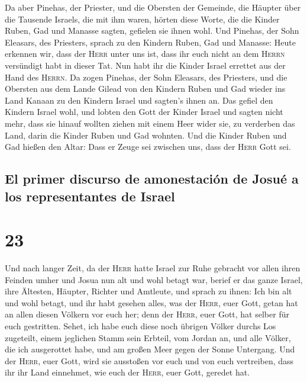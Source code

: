  Da aber Pinehas, der Priester, und die Obersten der
Gemeinde, die Häupter über die Tausende Israels, die mit ihm waren,
hörten diese Worte, die die Kinder Ruben, Gad und Manasse sagten,
gefielen sie ihnen wohl.  Und Pinehas, der Sohn Eleasars,
des Priesters, sprach zu den Kindern Ruben, Gad und Manasse: Heute
erkennen wir, dass der \textsc{Herr} unter uns ist, dass ihr euch nicht
an dem \textsc{Herrn} versündigt habt in dieser Tat. Nun habt ihr die
Kinder Israel errettet aus der Hand des \textsc{Herrn}. 
Da zogen Pinehas, der Sohn Eleasars, des Priesters, und die Obersten aus
dem Lande Gilead von den Kindern Ruben und Gad wieder ins Land Kanaan zu
den Kindern Israel und sagten's ihnen an.  Das gefiel den
Kindern Israel wohl, und lobten den Gott der Kinder Israel und sagten
nicht mehr, dass sie hinauf wollten ziehen mit einem Heer wider sie, zu
verderben das Land, darin die Kinder Ruben und Gad wohnten.
 Und die Kinder Ruben und Gad hießen den Altar: Dass er
Zeuge sei zwischen uns, dass der \textsc{Herr} Gott sei.

\hypertarget{el-primer-discurso-de-amonestaciuxf3n-de-josuuxe9-a-los-representantes-de-israel}{%
\subsection{El primer discurso de amonestación de Josué a los
representantes de
Israel}\label{el-primer-discurso-de-amonestaciuxf3n-de-josuuxe9-a-los-representantes-de-israel}}

\hypertarget{section-22}{%
\section{23}\label{section-22}}

 Und nach langer Zeit, da der \textsc{Herr} hatte Israel
zur Ruhe gebracht vor allen ihren Feinden umher und Josua nun alt und
wohl betagt war,  berief er das ganze Israel, ihre
Ältesten, Häupter, Richter und Amtleute, und sprach zu ihnen: Ich bin
alt und wohl betagt,  und ihr habt gesehen alles, was der
\textsc{Herr}, euer Gott, getan hat an allen diesen Völkern vor euch
her; denn der \textsc{Herr}, euer Gott, hat selber für euch gestritten.
 Sehet, ich habe euch diese noch übrigen Völker durchs Los
zugeteilt, einem jeglichen Stamm sein Erbteil, vom Jordan an, und alle
Völker, die ich ausgerottet habe, und am großen Meer gegen der Sonne
Untergang.  Und der \textsc{Herr}, euer Gott, wird sie
ausstoßen vor euch und von euch vertreiben, dass ihr ihr Land einnehmet,
wie euch der \textsc{Herr}, euer Gott, geredet hat.

